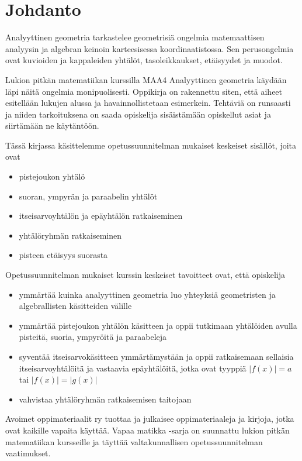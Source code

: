 \chapter{Johdanto}

Analyyttinen geometria tarkastelee geometrisiä ongelmia matemaattisen analyysin ja algebran keinoin karteesisessa koordinaatistossa. Sen perusongelmia ovat kuvioiden ja kappaleiden yhtälöt, tasoleikkaukset, etäisyydet ja muodot.

Lukion pitkän matematiikan kurssilla MAA4 Analyyttinen geometria käydään läpi näitä ongelmia monipuolisesti. Oppikirja on rakennettu siten, että aiheet esitellään lukujen alussa ja havainnollistetaan esimerkein. Tehtäviä on runsaasti ja niiden tarkoituksena on saada opiskelija sisäistämään opiskellut asiat ja siirtämään ne käytäntöön.

Tässä kirjassa käsittelemme opetussuunnitelman mukaiset keskeiset sisällöt, joita ovat
\begin{itemize}
\item pistejoukon yhtälö
\item suoran, ympyrän ja paraabelin yhtälöt
\item itseisarvoyhtälön ja epäyhtälön ratkaiseminen
\item yhtälöryhmän ratkaiseminen
\item pisteen etäisyys suorasta
\end{itemize}

Opetussuunnitelman mukaiset kurssin keskeiset tavoitteet ovat, että opiskelija
\begin{itemize}
\item ymmärtää kuinka analyyttinen geometria luo yhteyksiä geometristen ja algebrallisten
käsitteiden välille 
\item ymmärtää pistejoukon yhtälön käsitteen ja oppii tutkimaan yhtälöiden avulla pisteitä,
suoria, ympyröitä ja paraabeleja 
\item syventää itseisarvokäsitteen ymmärtämystään ja oppii ratkaisemaan sellaisia itseisarvoyhtälöitä ja vastaavia epäyhtälöitä, jotka ovat tyyppiä $|f(x)|=a$ tai $|f(x)|=|g(x)|$
\item vahvistaa yhtälöryhmän ratkaisemisen taitojaan
\end{itemize}

Avoimet oppimateriaalit ry tuottaa ja julkaisee oppimateriaaleja ja kirjoja, jotka ovat kaikille vapaita käyttää. Vapaa matikka -sarja on suunnattu lukion pitkän matematiikan kursseille ja täyttää valtakunnallisen opetussuunnitelman vaatimukset.
